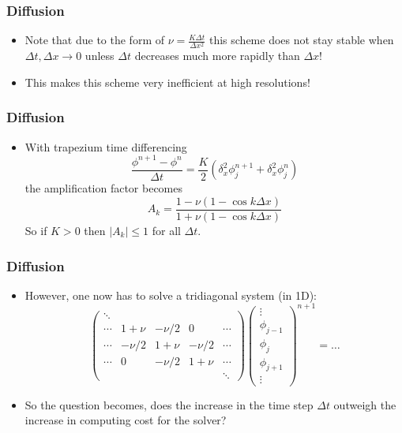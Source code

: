 \documentclass[aspectratio=43,9pt]{beamer}
\begin{document}
%
%
\begin{frame}
	\frametitle{Diffusion}
	\begin{itemize}
		\item Note that due to the form of $\nu = \frac{K \Delta t}{\Delta x^2}$ this scheme does not stay stable when $\Delta t, \Delta x \rightarrow 0$
	unless $\Delta t$ decreases much more rapidly than $\Delta x$!\vspace*{2ex}
		\item This makes this scheme very inefficient at high resolutions!
	\end{itemize}
\end{frame}
%
%
\begin{frame}
	\frametitle{Diffusion}
	\begin{itemize}
		\item With trapezium time differencing
		\begin{equation*}
			\frac{\phi^{n+1} - \phi^n}{\Delta t} =\frac{K}{2}\left(\delta_x^2 \phi^{n+1}_j + \delta_x^2 \phi^n_j\right)
		\end{equation*}
		the amplification factor becomes
		\begin{equation*}
			A_k = \frac{1 - \nu \left( 1 - \cos k \Delta x \right)}	{1 + \nu \left( 1 - \cos k \Delta x \right)}
		\end{equation*}
		So if $K > 0$ then  $| A_k | \le 1$ for	all $\Delta t$.
	\end{itemize}
\end{frame}
%
%
\begin{frame}
	\frametitle{Diffusion}
	\begin{itemize}
		\item However, one now has to solve a tridiagonal system (in 1D):
			\begin{equation*}
				\left(\begin{array}{ccccc}
					\ddots\\
					\cdots & 1+\nu &-\nu/2 & 0 & \cdots \\
					\cdots & -\nu/2 & 1+\nu & -\nu/2 & \cdots \\
					\cdots & 0 & -\nu/2 & 1+\nu & \cdots \\
					&&&&\ddots
				\end{array}\right)\left(\begin{array}{c}\vdots \\ \phi_{j-1} \\ \phi_j \\ \phi_{j+1} \\ \vdots \end{array}\right)^{n+1}
					= \ldots
			\end{equation*}\vspace*{2ex}
		\item So the question becomes, does the increase in the  time step $\Delta t$ outweigh the increase in computing cost for the solver?
	\end{itemize}
\end{frame}
\end{document}
